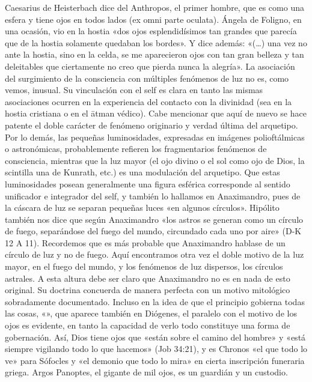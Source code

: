 \documentclass[a4paper]{article}
\begin{document}
Caesarius de Heisterbach dice del Anthropos, el primer hombre, que es como una
esfera y tiene ojos en todos lados (ex omni parte oculata). Ángela de Foligno,
en una ocasión, vio en la hostia «dos ojos esplendidísimos tan grandes que
parecía que de la hostia solamente quedaban los bordes». Y dice además: «(…) una
vez no ante la hostia, sino en la celda, se me aparecieron ojos con tan gran
belleza y tan deleitables que ciertamente no creo que pierda nunca la alegría».
La asociación del surgimiento de la consciencia con múltiples fenómenos de luz
no es, como vemos, inusual. Su vinculación con el self es clara en tanto las
mismas asociaciones ocurren en la experiencia del contacto con la divinidad (sea
en la hostia cristiana o en el ātman védico). Cabe mencionar que aquí de nuevo
se hace patente el doble carácter de fenómeno originario y verdad última del
arquetipo. Por lo demás, las pequeñas luminosidades, expresadas en imágenes
polioftálmicas o astronómicas, probablemente refieren los fragmentarios
fenómenos de consciencia, mientras que la luz mayor (el ojo divino o el sol como
ojo de Dios, la scintilla una de Kunrath, etc.) es una modulación del arquetipo.
Que estas luminosidades posean generalmente una figura esférica corresponde al
sentido unificador e integrador del self, y también lo hallamos en Anaximandro,
pues de la cáscara de luz se separan pequeñas luces «en algunos círculos».
Hipólito también nos dice que según Anaximandro «los astros se generan como un
círculo de fuego, separándose del fuego del mundo, circundado cada uno por aire»
(D-K 12 A 11). Recordemos que es más probable que Anaximandro hablase de un
círculo de luz y no de fuego. Aquí encontramos otra vez el doble motivo de la
luz mayor, en el fuego del mundo, y los fenómenos de luz dispersos, los círculos
astrales. A esta altura debe ser claro que Anaximandro no es en nada de esto
original. Su doctrina concuerda de manera perfecta con un motivo mitológico
sobradamente documentado. Incluso en la idea de que el principio gobierna todas
las cosas, «», que aparece también en Diógenes, el paralelo con el motivo de los
ojos es evidente, en tanto la capacidad de verlo todo constituye una forma de
gobernación. Así, Dios tiene ojos que «están sobre el camino del hombre» y «está
siempre vigilando todo lo que hacemos» (Job 34:21), y es Chronos «el que todo lo
ve» para Sófocles y «el demonio que todo lo mira» en cierta inscripción
funeraria griega. Argos Panoptes, el gigante de mil ojos, es un guardián y un
custodio.
\end{document}
